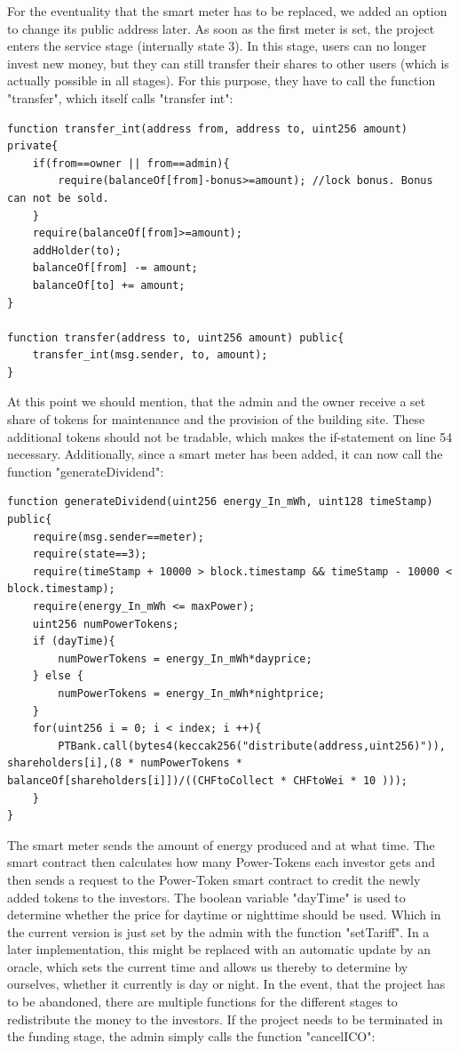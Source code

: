 For the eventuality that the smart meter has to be replaced, we added an option to change its public address later. As soon as the first meter is set, the project enters the service stage (internally state 3). In this stage, users can no longer invest new money, but they can still transfer their shares to other users (which is actually possible in all stages). For this purpose, they have to call the function "transfer", which itself calls "transfer int": 

\begin{lstlisting}[language=Solidity, firstnumber=53]
function transfer_int(address from, address to, uint256 amount) private{
    if(from==owner || from==admin){
        require(balanceOf[from]-bonus>=amount); //lock bonus. Bonus can not be sold.
    }
    require(balanceOf[from]>=amount);
    addHolder(to);
    balanceOf[from] -= amount;
    balanceOf[to] += amount;
}
    
function transfer(address to, uint256 amount) public{
    transfer_int(msg.sender, to, amount);
}
\end{lstlisting}

At this point we should mention, that the admin and the owner receive a set share of tokens for maintenance and the provision of the building site. These additional tokens should not be tradable, which makes the if-statement on line 54 necessary. Additionally, since a smart meter has been added, it can now call the function "generateDividend":

\begin{lstlisting}[language=Solidity, firstnumber=101]
function generateDividend(uint256 energy_In_mWh, uint128 timeStamp) public{
    require(msg.sender==meter);
    require(state==3);
    require(timeStamp + 10000 > block.timestamp && timeStamp - 10000 < block.timestamp);
    require(energy_In_mWh <= maxPower);
    uint256 numPowerTokens; 
    if (dayTime){
        numPowerTokens = energy_In_mWh*dayprice;
    } else {
        numPowerTokens = energy_In_mWh*nightprice;
    }
    for(uint256 i = 0; i < index; i ++){
        PTBank.call(bytes4(keccak256("distribute(address,uint256)")), shareholders[i],(8 * numPowerTokens * balanceOf[shareholders[i]])/((CHFtoCollect * CHFtoWei * 10 )));
    }
}
\end{lstlisting}

The smart meter sends the amount of energy produced and at what time. The smart contract then calculates how many Power-Tokens each investor gets and then sends a request to the Power-Token smart contract to credit the newly added tokens to the investors. The boolean variable "dayTime" is used to determine whether the price for daytime or nighttime should be used. Which in the current version is just set by the admin with the function "setTariff". In a later implementation, this might be replaced with an automatic update by an oracle, which sets the current time and allows us thereby to determine by ourselves, whether it currently is day or night.
In the event, that the project has to be abandoned, there are multiple functions for the different stages to redistribute the money to the investors. If the project needs to be terminated in the funding stage, the admin simply calls the function "cancelICO":

